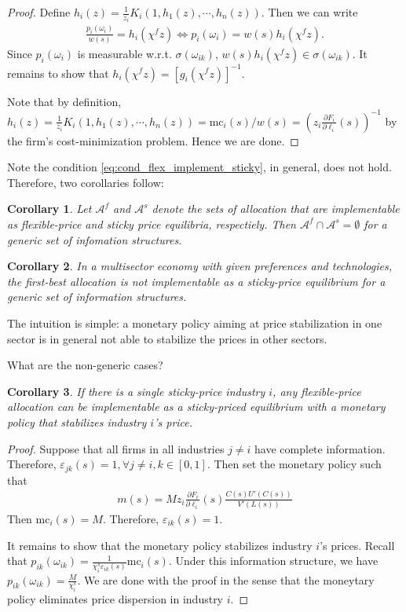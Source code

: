\documentclass[12pt]{article}
\newtheorem{corollary}{Corollary}
\numberwithin{equation}{section}
\begin{document}
\begin{proof}
    Define $h_i(z) = \frac{1}{z_i} K_i(1, h_1(z), \cdots, h_n(z))$. Then we can write 
    \begin{align*}
        \frac{p_i(\omega_i)}{w(s)} = h_i(\chi^f z) \iff p_{i}(\omega_i) = w(s) h_i(\chi^f z).
    \end{align*}
    Since $p_i(\omega_i)$ is measurable w.r.t. $\sigma(\omega_{ik})$, $w(s) h_i(\chi^f z) \in \sigma(\omega_{ik})$. It remains to show that $h_i(\chi^f z) = [g_i(\chi^f z)]^{-1}$. 
    
    Note that by definition, $h_i(z) = \frac{1}{z_i} K_i(1, h_1(z), \cdots, h_n(z)) = \text{mc}_i(s)/w(s) = \left(z_i \frac{\partial F_i}{\partial \ell_i}(s) \right)^{-1}$ by the firm's cost-minimization problem. Hence we are done. 
\end{proof}

Note the condition \eqref{eq:cond_flex_implement_sticky}, in general, does not hold. Therefore, two corollaries follow:
\begin{corollary}
    Let $\mathcal{A}^f$ and $\mathcal{A}^s$ denote the sets of allocation that are implementable as flexible-price and sticky price equilibria, respectiely. Then $\mathcal{A}^f \cap \mathcal{A}^s = \emptyset$ for a generic set of infomation structures.
\end{corollary}

\begin{corollary}
    In a multisector economy with given preferences and technologies, the first-best allocation is not implementable as a sticky-price equilibrium for a generic set of information structures.
\end{corollary}

The intuition is simple: a monetary policy aiming at price stabilization in one sector is in general not able to stabilize the prices in other sectors.


What are the non-generic cases?
\begin{corollary}
    If there is a single sticky-price industry $i$, any flexible-price allocation can be implementable as a sticky-priced equilibrium with a monetary policy that stabilizes industry $i$'s price.
\end{corollary}

\begin{proof}
    Suppose that all firms in all industries $j \neq i$ have complete information. Therefore, $\varepsilon_{jk}(s) = 1, \forall j\neq i, k \in [0,1]$. Then set the monetary policy such that 
    \begin{align*}
        m(s) = M z_i \frac{\partial F_i}{\partial \ell_i}(s) \frac{C(s) U'(C(s))}{V'(L(s))}
    \end{align*}
    Then $\text{mc}_i(s) = M$. Therefore, $\varepsilon_{ik}(s) = 1$.

    It remains to show that the monetary policy stabilizes industry $i$'s prices. Recall that $p_{ik}(\omega_{ik}) = \frac{1}{\chi_i^s \varepsilon_{ik}(s)} \text{mc}_i(s)$. Under this information structure, we have $p_{ik}(\omega_{ik}) = \frac{M}{\chi_i^s}$. We are done with the proof in the sense that the moneytary policy eliminates price dispersion in industry $i$.
\end{proof}
\end{document}
